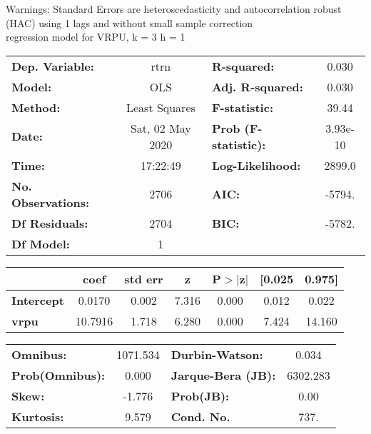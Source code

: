 Warnings: \newline
 [1] Standard Errors are heteroscedasticity and autocorrelation robust (HAC) using 1 lags and without small sample correction\\ 

regression model for VRPU, k = 3 h = 1\begin{center}
\begin{tabular}{lclc}
\toprule
\textbf{Dep. Variable:}    &       rtrn       & \textbf{  R-squared:         } &     0.030   \\
\textbf{Model:}            &       OLS        & \textbf{  Adj. R-squared:    } &     0.030   \\
\textbf{Method:}           &  Least Squares   & \textbf{  F-statistic:       } &     39.44   \\
\textbf{Date:}             & Sat, 02 May 2020 & \textbf{  Prob (F-statistic):} &  3.93e-10   \\
\textbf{Time:}             &     17:22:49     & \textbf{  Log-Likelihood:    } &    2899.0   \\
\textbf{No. Observations:} &        2706      & \textbf{  AIC:               } &    -5794.   \\
\textbf{Df Residuals:}     &        2704      & \textbf{  BIC:               } &    -5782.   \\
\textbf{Df Model:}         &           1      & \textbf{                     } &             \\
\bottomrule
\end{tabular}
\begin{tabular}{lcccccc}
                   & \textbf{coef} & \textbf{std err} & \textbf{z} & \textbf{P$> |$z$|$} & \textbf{[0.025} & \textbf{0.975]}  \\
\midrule
\textbf{Intercept} &       0.0170  &        0.002     &     7.316  &         0.000        &        0.012    &        0.022     \\
\textbf{vrpu}      &      10.7916  &        1.718     &     6.280  &         0.000        &        7.424    &       14.160     \\
\bottomrule
\end{tabular}
\begin{tabular}{lclc}
\textbf{Omnibus:}       & 1071.534 & \textbf{  Durbin-Watson:     } &    0.034  \\
\textbf{Prob(Omnibus):} &   0.000  & \textbf{  Jarque-Bera (JB):  } & 6302.283  \\
\textbf{Skew:}          &  -1.776  & \textbf{  Prob(JB):          } &     0.00  \\
\textbf{Kurtosis:}      &   9.579  & \textbf{  Cond. No.          } &     737.  \\
\bottomrule
\end{tabular}
\end{center}

